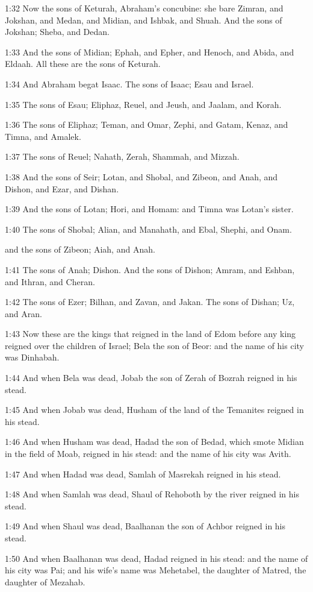 1:32 Now the sons of Keturah, Abraham's concubine: she bare Zimran, and Jokshan, and Medan, and Midian, and Ishbak, and Shuah. And the sons of Jokshan; Sheba, and Dedan.

1:33 And the sons of Midian; Ephah, and Epher, and Henoch, and Abida, and Eldaah. All these are the sons of Keturah.

1:34 And Abraham begat Isaac. The sons of Isaac; Esau and Israel.

1:35 The sons of Esau; Eliphaz, Reuel, and Jeush, and Jaalam, and Korah.

1:36 The sons of Eliphaz; Teman, and Omar, Zephi, and Gatam, Kenaz, and Timna, and Amalek.

1:37 The sons of Reuel; Nahath, Zerah, Shammah, and Mizzah.

1:38 And the sons of Seir; Lotan, and Shobal, and Zibeon, and Anah, and Dishon, and Ezar, and Dishan.

1:39 And the sons of Lotan; Hori, and Homam: and Timna was Lotan's sister.

1:40 The sons of Shobal; Alian, and Manahath, and Ebal, Shephi, and Onam.

and the sons of Zibeon; Aiah, and Anah.

1:41 The sons of Anah; Dishon. And the sons of Dishon; Amram, and Eshban, and Ithran, and Cheran.

1:42 The sons of Ezer; Bilhan, and Zavan, and Jakan. The sons of Dishan; Uz, and Aran.

1:43 Now these are the kings that reigned in the land of Edom before any king reigned over the children of Israel; Bela the son of Beor: and the name of his city was Dinhabah.

1:44 And when Bela was dead, Jobab the son of Zerah of Bozrah reigned in his stead.

1:45 And when Jobab was dead, Husham of the land of the Temanites reigned in his stead.

1:46 And when Husham was dead, Hadad the son of Bedad, which smote Midian in the field of Moab, reigned in his stead: and the name of his city was Avith.

1:47 And when Hadad was dead, Samlah of Masrekah reigned in his stead.

1:48 And when Samlah was dead, Shaul of Rehoboth by the river reigned in his stead.

1:49 And when Shaul was dead, Baalhanan the son of Achbor reigned in his stead.

1:50 And when Baalhanan was dead, Hadad reigned in his stead: and the name of his city was Pai; and his wife's name was Mehetabel, the daughter of Matred, the daughter of Mezahab.

